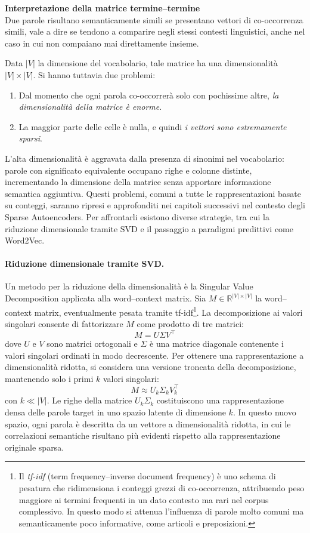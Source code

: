 \begin{notebox}
\textbf{Interpretazione della matrice termine--termine}\\
Due parole risultano semanticamente simili se presentano vettori di co-occorrenza simili, vale a dire se tendono a comparire negli stessi contesti linguistici, anche nel caso in cui non compaiano mai direttamente insieme.
\end{notebox}
Data $|V|$ la dimensione del vocabolario, tale matrice ha una dimensionalità $|V| \times |V|$. Si hanno tuttavia due problemi:
\begin{enumerate}
    \item Dal momento che ogni parola co-occorrerà solo con pochissime altre, \textit{la dimensionalità della matrice è enorme}.
    \item La maggior parte delle celle è nulla, e quindi \textit{i vettori sono estremamente sparsi}.
\end{enumerate}
L'alta dimensionalità è aggravata dalla presenza di sinonimi nel vocabolario: parole con significato equivalente occupano righe e colonne distinte, incrementando la dimensione della matrice senza apportare informazione semantica aggiuntiva. Questi problemi, comuni a tutte le rappresentazioni basate su conteggi, saranno ripresi e approfonditi nei capitoli successivi nel contesto degli Sparse Autoencoders. Per affrontarli esistono diverse strategie, tra cui la riduzione dimensionale tramite SVD e il passaggio a paradigmi predittivi come Word2Vec.
\paragraph{Riduzione dimensionale tramite SVD.}
Un metodo per la riduzione della dimensionalità è la Singular Value Decomposition applicata alla word--context matrix. Sia $M \in \mathbb{R}^{|V| \times |V|}$ la word--context matrix, eventualmente pesata tramite tf-idf\footnote{Il \textit{tf-idf} (term frequency--inverse document frequency) è uno schema di pesatura che ridimensiona i conteggi grezzi di co-occorrenza, attribuendo peso maggiore ai termini frequenti in un dato contesto ma rari nel corpus complessivo. In questo modo si attenua l'influenza di parole molto comuni ma semanticamente poco informative, come articoli e preposizioni.}. La decomposizione ai valori singolari consente di fattorizzare $M$ come prodotto di tre matrici:
\[
M = U \Sigma V^\top
\]
dove $U$ e $V$ sono matrici ortogonali e $\Sigma$ è una matrice diagonale contenente i valori singolari ordinati in modo decrescente. Per ottenere una rappresentazione a dimensionalità ridotta, si considera una versione troncata della decomposizione, mantenendo solo i primi $k$ valori singolari:
\[
M \approx U_k \Sigma_k V_k^\top
\]
con $k \ll |V|$. Le righe della matrice $U_k \Sigma_k$ costituiscono una rappresentazione densa delle parole target in uno spazio latente di dimensione $k$. In questo nuovo spazio, ogni parola è descritta da un vettore a dimensionalità ridotta, in cui le correlazioni semantiche risultano più evidenti rispetto alla rappresentazione originale sparsa.
